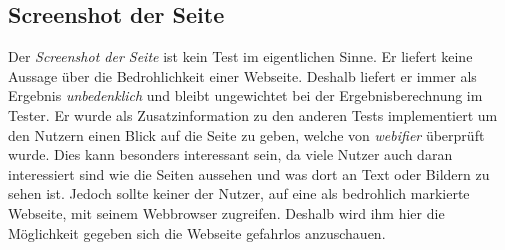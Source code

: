 \subsection{Screenshot der Seite}
Der \textit{Screenshot der Seite} ist kein Test im eigentlichen Sinne. Er liefert keine Aussage über
die Bedrohlichkeit einer Webseite. Deshalb liefert er immer als Ergebnis \textit{unbedenklich} und
bleibt ungewichtet bei der Ergebnisberechnung im Tester. Er wurde als Zusatzinformation zu den
anderen Tests implementiert um den Nutzern einen Blick auf die Seite zu geben, welche von
\textit{webifier} überprüft wurde.
Dies kann besonders interessant sein, da viele Nutzer auch daran interessiert sind wie die Seiten
aussehen und was dort an Text oder Bildern zu sehen ist. Jedoch sollte keiner der Nutzer, auf
eine als bedrohlich markierte Webseite, mit seinem Webbrowser zugreifen. Deshalb wird ihm hier die
Möglichkeit gegeben sich die Webseite gefahrlos anzuschauen.
